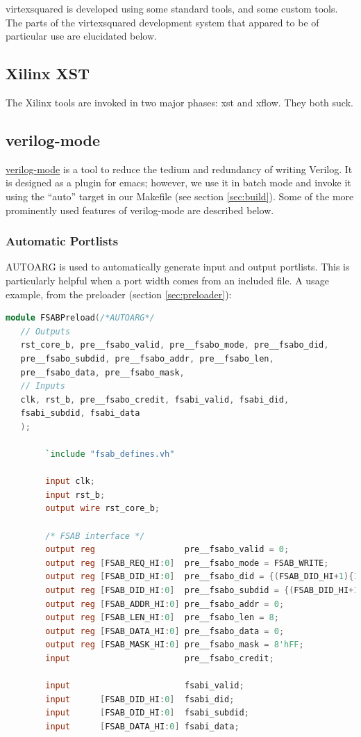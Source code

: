 \documentclass[10pt]{article}
\begin{document}
virtexsquared is developed using some standard tools, and some custom tools. 
The parts of the virtexsquared development system that appared to be of
particular use are elucidated below.

\subsection{Xilinx XST}

The Xilinx tools are invoked in two major phases: xst and xflow. They both
suck.

\subsection{verilog-mode}

\href{http://www.veripool.org/wiki/verilog-mode}{verilog-mode} is a tool to
reduce the tedium and redundancy of writing Verilog.  It is designed as a
plugin for emacs; however, we use it in batch mode and invoke it using the
``auto'' target in our Makefile (see section \ref{sec:build}).  Some of the
more prominently used features of verilog-mode are described below.

\subsubsection{Automatic Portlists}

AUTOARG is used to automatically generate input and output portlists. This
is particularly helpful when a port width comes from an included file. A
usage example, from the preloader (section \ref{sec:preloader}):


\begin{lstlisting}[basicstyle=\footnotesize,language=Verilog]
module FSABPreload(/*AUTOARG*/
   // Outputs
   rst_core_b, pre__fsabo_valid, pre__fsabo_mode, pre__fsabo_did,
   pre__fsabo_subdid, pre__fsabo_addr, pre__fsabo_len,
   pre__fsabo_data, pre__fsabo_mask,
   // Inputs
   clk, rst_b, pre__fsabo_credit, fsabi_valid, fsabi_did,
   fsabi_subdid, fsabi_data
   );
 
        `include "fsab_defines.vh"
 
        input clk;
        input rst_b;
        output wire rst_core_b;
 
        /* FSAB interface */
        output reg                  pre__fsabo_valid = 0;
        output reg [FSAB_REQ_HI:0]  pre__fsabo_mode = FSAB_WRITE;
        output reg [FSAB_DID_HI:0]  pre__fsabo_did = {(FSAB_DID_HI+1){1'b1}};
        output reg [FSAB_DID_HI:0]  pre__fsabo_subdid = {(FSAB_DID_HI+1){1'b0}};
        output reg [FSAB_ADDR_HI:0] pre__fsabo_addr = 0;
        output reg [FSAB_LEN_HI:0]  pre__fsabo_len = 8;
        output reg [FSAB_DATA_HI:0] pre__fsabo_data = 0;
        output reg [FSAB_MASK_HI:0] pre__fsabo_mask = 8'hFF;
        input                       pre__fsabo_credit;
 
        input                       fsabi_valid;
        input      [FSAB_DID_HI:0]  fsabi_did;
        input      [FSAB_DID_HI:0]  fsabi_subdid;
        input      [FSAB_DATA_HI:0] fsabi_data;
\end{lstlisting}
\end{document}
